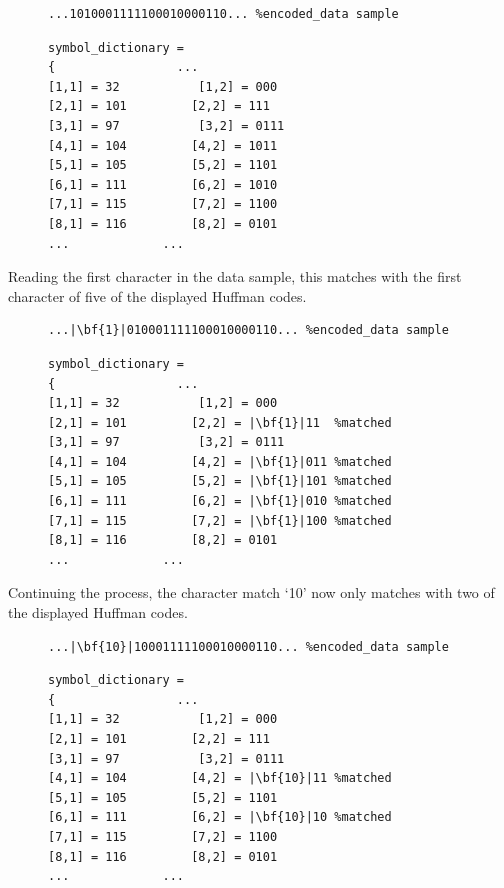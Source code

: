\documentclass[12pt]{article}
\begin{document}
\begin{figure}[H]
\begin{verbatim}
...1010001111100010000110... %encoded_data sample
\end{verbatim}
\begin{verbatim}
symbol_dictionary =
{				  ...
[1,1] = 32			 [1,2] = 000
[2,1] = 101			[2,2] = 111
[3,1] = 97			 [3,2] = 0111
[4,1] = 104			[4,2] = 1011
[5,1] = 105			[5,2] = 1101
[6,1] = 111			[6,2] = 1010
[7,1] = 115			[7,2] = 1100
[8,1] = 116			[8,2] = 0101
...				...
\end{verbatim} 
\end{figure}

Reading the first character in the data sample, this matches with the first character of five of the displayed Huffman codes.

\begin{figure}[H]
\begin{verbatim}
...|\bf{1}|010001111100010000110... %encoded_data sample
\end{verbatim}
\begin{verbatim}
symbol_dictionary =
{				  ...
[1,1] = 32			 [1,2] = 000
[2,1] = 101			[2,2] = |\bf{1}|11  %matched
[3,1] = 97			 [3,2] = 0111
[4,1] = 104			[4,2] = |\bf{1}|011 %matched
[5,1] = 105			[5,2] = |\bf{1}|101 %matched
[6,1] = 111			[6,2] = |\bf{1}|010 %matched
[7,1] = 115			[7,2] = |\bf{1}|100 %matched
[8,1] = 116			[8,2] = 0101
...				...
\end{verbatim} 
\end{figure}

Continuing the process, the character match `10' now only matches with two of the displayed Huffman codes.

\begin{figure}[H]
\begin{verbatim}
...|\bf{10}|10001111100010000110... %encoded_data sample
\end{verbatim}
\begin{verbatim}
symbol_dictionary =
{				  ...
[1,1] = 32			 [1,2] = 000
[2,1] = 101			[2,2] = 111
[3,1] = 97			 [3,2] = 0111
[4,1] = 104			[4,2] = |\bf{10}|11 %matched
[5,1] = 105			[5,2] = 1101
[6,1] = 111			[6,2] = |\bf{10}|10 %matched
[7,1] = 115			[7,2] = 1100
[8,1] = 116			[8,2] = 0101
...				...
\end{verbatim} 
\end{figure}
\end{document}
